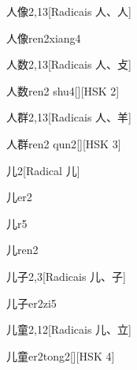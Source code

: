 \begin{entry}{人像}{2,13}[Radicais ⼈、⼈]
  \begin{phonetics}{人像}{ren2xiang4}
  \end{phonetics}
\end{entry}

\begin{entry}{人数}{2,13}[Radicais ⼈、⽁]
  \begin{phonetics}{人数}{ren2 shu4}[][HSK 2]
  \end{phonetics}
\end{entry}

\begin{entry}{人群}{2,13}[Radicais ⼈、⽺]
  \begin{phonetics}{人群}{ren2 qun2}[][HSK 3]
  \end{phonetics}
\end{entry}

\begin{entry}{儿}{2}[Radical ⼉]
  \begin{phonetics}{儿}{er2}
  \end{phonetics}
  \begin{phonetics}{儿}{r5}
  \end{phonetics}
  \begin{phonetics}{儿}{ren2}
  \end{phonetics}
\end{entry}

\begin{entry}{儿子}{2,3}[Radicais ⼉、⼦]
  \begin{phonetics}{儿子}{er2zi5}
  \end{phonetics}
\end{entry}

\begin{entry}{儿童}{2,12}[Radicais ⼉、⽴]
  \begin{phonetics}{儿童}{er2tong2}[][HSK 4]
  \end{phonetics}
\end{entry}

